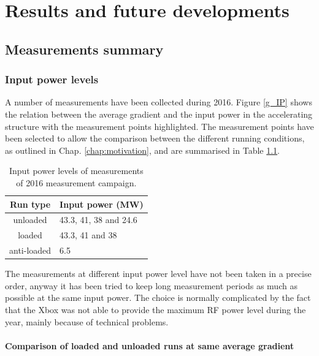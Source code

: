 \chapter[Results and future developments]{Results and future developments}

\section[Measurements summary]{Measurements summary}

\subsection[Input power levels]{Input power levels}

A number of measurements have been collected during 2016. Figure \ref{g_IP} shows the relation between the average gradient and the input power in the accelerating structure with the measurement points highlighted. The measurement points have been selected to allow the comparison between the different running conditions, as outlined in Chap. \ref{chap:motivation}, and are summarised in Table \ref{run_pwr}.

\begin{table}
  \centering
    \begin{tabular}{ c l }
    \hline
    \hline
    Run type		&	Input power (MW)		\\
    \hline
    unloaded 		&	43.3, 41, 38 and 24.6	\\
    loaded			&	43.3, 41 and 38			\\
    anti-loaded		&	6.5					\\
    \hline
    \hline
    \end{tabular}
\caption{Input power levels of measurements of 2016 measurement campaign.}
\label{run_pwr}
\end{table}

The measurements at different input power level have not been taken in a precise order, anyway it has been tried to keep long measurement periods as much as possible at the same input power. 
The choice is normally complicated by the fact that the Xbox was not able to provide the maximum RF power level during the year, mainly because of technical problems.


\subsubsection{Comparison of loaded and unloaded runs at same average gradient}

